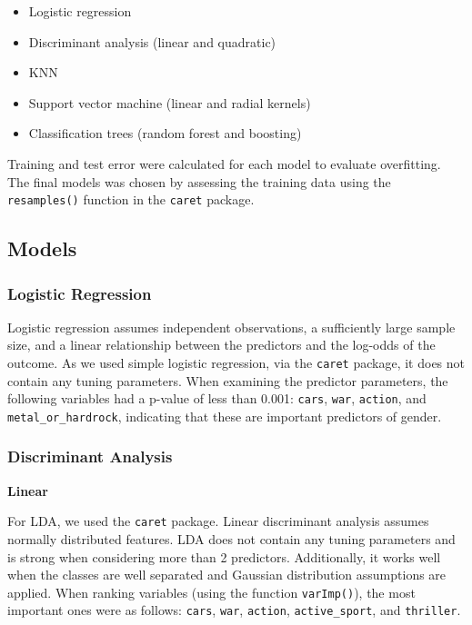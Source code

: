 \documentclass[]{article}
\providecommand{\tightlist}{%
  \setlength{\itemsep}{0pt}\setlength{\parskip}{0pt}}
\begin{document}
\begin{itemize}
\tightlist
\item
  Logistic regression
\item
  Discriminant analysis (linear and quadratic)
\item
  KNN
\item
  Support vector machine (linear and radial kernels)
\item
  Classification trees (random forest and boosting)
\end{itemize}

Training and test error were calculated for each model to evaluate
overfitting. The final models was chosen by assessing the training data
using the \texttt{resamples()} function in the \texttt{caret} package.

\subsection{Models}\label{models}

\subsubsection{Logistic Regression}\label{logistic-regression}

Logistic regression assumes independent observations, a sufficiently
large sample size, and a linear relationship between the predictors and
the log-odds of the outcome. As we used simple logistic regression, via
the \texttt{caret} package, it does not contain any tuning parameters.
When examining the predictor parameters, the following variables had a
p-value of less than 0.001: \texttt{cars}, \texttt{war},
\texttt{action}, and \texttt{metal\_or\_hardrock}, indicating that these
are important predictors of gender.

\subsubsection{Discriminant Analysis}\label{discriminant-analysis}

\textbf{Linear}

For LDA, we used the \texttt{caret} package. Linear discriminant
analysis assumes normally distributed features. LDA does not contain any
tuning parameters and is strong when considering more than 2 predictors.
Additionally, it works well when the classes are well separated and
Gaussian distribution assumptions are applied. When ranking variables
(using the function \texttt{varImp()}), the most important ones were as
follows: \texttt{cars}, \texttt{war}, \texttt{action},
\texttt{active\_sport}, and \texttt{thriller}.
\end{document}
